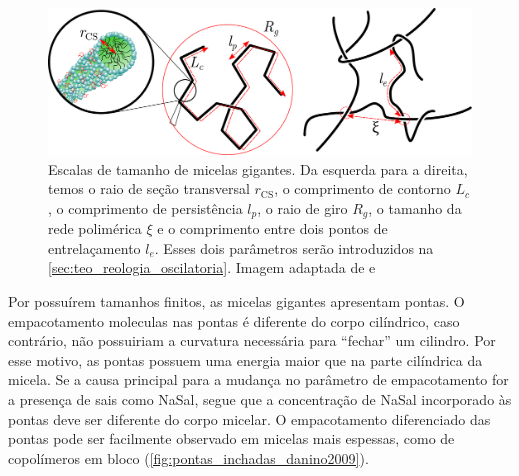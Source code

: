 		\begin{figure}[h]
			\centering
			\includegraphics[width=\textwidth]{imagens/artigos/escalas_tamanho_MG}
			\caption{Escalas de tamanho de micelas gigantes. Da esquerda para a direita, temos o raio de seção transversal \(r_\mathrm{CS}\), o comprimento de contorno \(L_c\), o comprimento de persistência \(l_p\), o raio de giro \(R_g\), o tamanho da rede polimérica \(\xi\) e o comprimento entre dois pontos de entrelaçamento \(l_e\). Esses dois parâmetros serão introduzidos na \autoref{sec:teo_reologia_oscilatoria}. Imagem adaptada de \citeauthor{Dreiss2007} e \citeauthor{Hoffmann1992a}}
			\label{fig:escalas_tamanho_mg}
		\end{figure}
		
		Por possuírem tamanhos finitos, as micelas gigantes apresentam pontas. O empacotamento moleculas nas pontas é diferente do corpo cilíndrico, caso contrário, não possuiriam a curvatura necessária para ``fechar'' um cilindro. Por esse motivo, as pontas possuem uma energia maior que na parte cilíndrica da micela.\cite{May2001a} Se a causa principal para a mudança no parâmetro de empacotamento for a presença de sais como NaSal, segue que a concentração de NaSal incorporado às pontas deve ser diferente do corpo micelar. O empacotamento diferenciado das pontas pode ser facilmente observado em micelas mais espessas, como de copolímeros em bloco (\autoref{fig:pontas_inchadas_danino2009}). 
		
